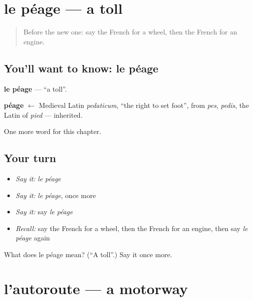 \section[le péage]{le péage — a toll}

\label{lesson:FR-C227-peage}



\begin{quote}
Before the new one: say the French for a wheel, then the French for an engine.
\end{quote}

\subsection*{You'll want to know: le péage}
\textbf{le péage} — \textquotedblleft{}a toll\textquotedblright{}.

\begin{cousinweb}
\textbf{péage} $\leftarrow$ Medieval Latin \emph{pedaticum}, \textquotedblleft{}the right to set foot\textquotedblright{}, from \emph{pes}, \emph{pedis}, the Latin of \emph{pied} — inherited.
\end{cousinweb}

\begin{grammarlens}[title={What you've built}]
One more word for this chapter.
\end{grammarlens}

\subsection*{Your turn}
\begin{itemize}
\raggedright
  \item \emph{Say it:} \emph{le péage}
  \item \emph{Say it:} \emph{le péage}, once more
  \item \emph{Say it:} say \emph{le péage}
  \item \emph{Recall:} say the French for a wheel, then the French for an engine, then say \emph{le péage} again
\end{itemize}

\begin{tcolorbox}[breakable,colback=teal!4,colframe=teal!35!black,title={Before you move on}]
What does le péage mean? (\textquotedblleft{}A toll\textquotedblright{}.) Say it once more.
\end{tcolorbox}
\section[l'autoroute]{l'autoroute — a motorway}

